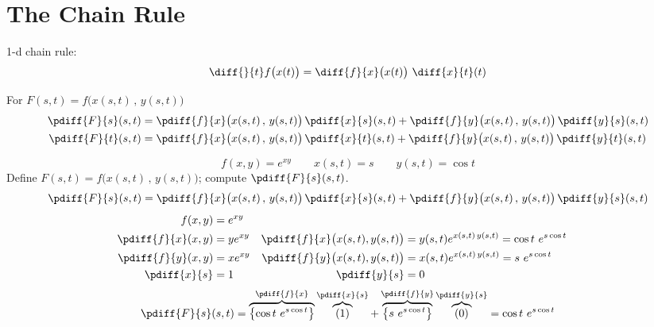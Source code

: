 \section{The Chain Rule}\label{sec chain rule}
1-d chain rule:
\begin{equation*}
\diff{}{t}f\big(x(t)\big)
= \diff{f}{x}\big(x(t)\big)\ \diff{x}{t}(t)
\end{equation*}
\begin{theorem}\label{thm:chainRule}
For $F(s,t)=f\big(x(s,t)\,,\,y(s,t)\big)$
\begin{align*}
\pdiff{F}{s}(s,t)
&=  \pdiff{f}{x}\big(x(s,t)\,,\,y(s,t)\big)\, \pdiff{x}{s}(s,t)
+\pdiff{f}{y}\big(x(s,t)\,,\,y(s,t)\big)\, \pdiff{y}{s}(s,t) \\
\pdiff{F}{t}(s,t)
&=  \pdiff{f}{x}\big(x(s,t)\,,\,y(s,t)\big)\, \pdiff{x}{t}(s,t)
+\pdiff{f}{y}\big(x(s,t)\,,\,y(s,t)\big)\, \pdiff{y}{t}(s,t)
\end{align*}
\end{theorem}%
{}
\begin{eg}\label{eg:chainRuleAA}
\begin{equation*}
f(x,y)=e^{xy}\qquad x(s,t)=s \qquad y(s,t)=\cos t
\end{equation*}
Define $F(s,t)=f\big(x(s,t)\,,\,y(s,t)\big)$; compute $\pdiff{F}{s}(s,t)$.
\soln
\begin{equation*}
\pdiff{F}{s}(s,t)
=  \pdiff{f}{x}\big(x(s,t)\,,\,y(s,t)\big)\, \pdiff{x}{s}(s,t)
+\pdiff{f}{y}\big(x(s,t)\,,\,y(s,t)\big)\, \pdiff{y}{s}(s,t)
\end{equation*}
\begin{align*}
f(x,y)&=e^{xy}  \\
\pdiff{f}{x}(x,y)&= ye^{xy}  &
\pdiff{f}{x}\big(x(s,t),y(s,t)\big)&= y(s,t) e^{x(s,t)\,y(s,t)}
= \cos t\ e^{s\cos t} \\
\pdiff{f}{y}(x,y)&= xe^{xy}  &
\pdiff{f}{y}\big(x(s,t),y(s,t)\big)&= x(s,t) e^{x(s,t)\,y(s,t)}
= s\ e^{s\cos t} \\
\pdiff{x}{s}&=1 &
\pdiff{y}{s}&=0
\end{align*}
$$
\pdiff{F}{s}(s,t)=\overbrace{\left\{\cos t\ e^{s\cos t}\right\}}^{\pdiff{f}{x}}
\overbrace{(1) }^{\pdiff{x}{s}}
+\overbrace{\left\{s\ e^{s\cos t}\right\}}^{\pdiff{f}{y}}
\overbrace{(0) }^{\pdiff{y}{s}}
= \cos t\ e^{s\cos t}
$$
\end{eg}
